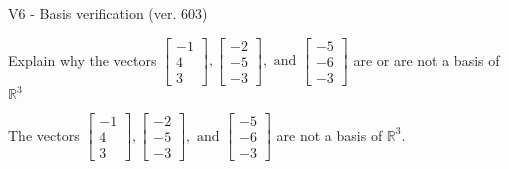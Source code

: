 \begin{exercise}
  \begin{exerciseTitle}V6 - Basis verification (ver. 603)\end{exerciseTitle}
  \begin{exerciseStatement}
    Explain why the vectors \(\left[\begin{array}{r}
-1 \\
4 \\
3
\end{array}\right] , \left[\begin{array}{r}
-2 \\
-5 \\
-3
\end{array}\right] , \text{ and } \left[\begin{array}{r}
-5 \\
-6 \\
-3
\end{array}\right]\) are or are not a basis of \(\mathbb{R}^3\)	


  \end{exerciseStatement}
  \begin{exerciseAnswer}
   The vectors \(\left[\begin{array}{r}
-1 \\
4 \\
3
\end{array}\right] , \left[\begin{array}{r}
-2 \\
-5 \\
-3
\end{array}\right] , \text{ and } \left[\begin{array}{r}
-5 \\
-6 \\
-3
\end{array}\right]\) 
  	 are not  a basis of \(\mathbb{R}^3\).
  


  \end{exerciseAnswer}
\end{exercise}